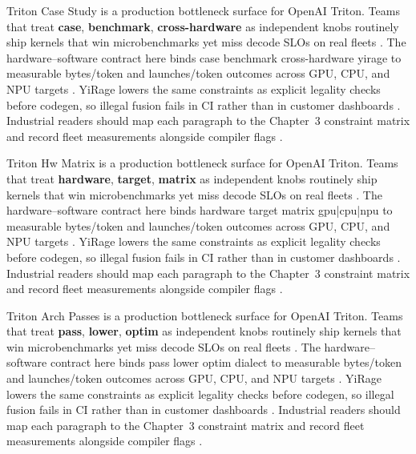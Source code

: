 Triton Case Study is a production bottleneck surface for OpenAI Triton. Teams that treat \textbf{case}, \textbf{benchmark}, \textbf{cross-hardware} as independent knobs routinely ship kernels that win microbenchmarks yet miss decode SLOs on real fleets \citep{semianalysis2024tma,dlbook}. The hardware--software contract here binds case benchmark cross-hardware yirage to measurable bytes/token and launches/token outcomes across GPU, CPU, and NPU targets \citep{amd2024xdna,dao2022flashattention}. YiRage lowers the same constraints as explicit legality checks before codegen, so illegal fusion fails in CI rather than in customer dashboards \citep{amd2024aie,kwon2023vllm}. Industrial readers should map each paragraph to the Chapter~3 constraint matrix and record fleet measurements alongside compiler flags \citep{dlbook,nvidia2024cudagraphs}.

Triton Hw Matrix is a production bottleneck surface for OpenAI Triton. Teams that treat \textbf{hardware}, \textbf{target}, \textbf{matrix} as independent knobs routinely ship kernels that win microbenchmarks yet miss decode SLOs on real fleets \citep{amd2024xdna,dao2022flashattention}. The hardware--software contract here binds hardware target matrix gpu|cpu|npu to measurable bytes/token and launches/token outcomes across GPU, CPU, and NPU targets \citep{amd2024aie,kwon2023vllm}. YiRage lowers the same constraints as explicit legality checks before codegen, so illegal fusion fails in CI rather than in customer dashboards \citep{dlbook,nvidia2024cudagraphs}. Industrial readers should map each paragraph to the Chapter~3 constraint matrix and record fleet measurements alongside compiler flags \citep{dao2022flashattention,liu2024deepseekv3}.

Triton Arch Passes is a production bottleneck surface for OpenAI Triton. Teams that treat \textbf{pass}, \textbf{lower}, \textbf{optim} as independent knobs routinely ship kernels that win microbenchmarks yet miss decode SLOs on real fleets \citep{amd2024aie,kwon2023vllm}. The hardware--software contract here binds pass lower optim dialect to measurable bytes/token and launches/token outcomes across GPU, CPU, and NPU targets \citep{dlbook,nvidia2024cudagraphs}. YiRage lowers the same constraints as explicit legality checks before codegen, so illegal fusion fails in CI rather than in customer dashboards \citep{dao2022flashattention,liu2024deepseekv3}. Industrial readers should map each paragraph to the Chapter~3 constraint matrix and record fleet measurements alongside compiler flags \citep{kwon2023vllm,patel2025llminference}.

